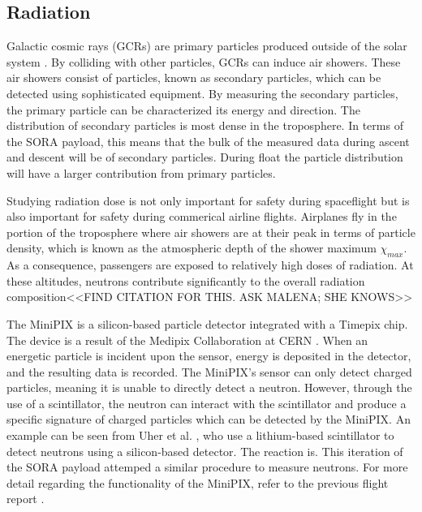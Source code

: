 \subsection{Radiation}
\label{sec: Radiation Background}

Galactic cosmic rays (GCRs) are primary particles produced outside of the solar system \cite{GCRs}.
By colliding with other particles, GCRs can induce air showers. 
These air showers consist of particles, known as secondary particles, which can be detected using sophisticated equipment.
By measuring the secondary particles, the primary particle can be characterized its energy and direction. 
The distribution of secondary particles \cite{Frank} is most dense in the troposphere. 
In terms of the SORA payload, this means that the bulk of the measured data during ascent and descent will 
be of secondary particles. During float the particle distribution will have a larger contribution from primary particles.

Studying radiation dose is not only important for safety during spaceflight but is also important for safety during commerical airline flights.
Airplanes fly in the portion of the troposphere where air showers are at their peak in terms of particle density, which is known as the atmospheric depth of the shower maximum $\chi _{max}$. As a consequence, passengers are exposed to relatively high doses of radiation.
At these altitudes, neutrons contribute significantly to the overall radiation composition<<FIND CITATION FOR THIS. ASK MALENA; SHE KNOWS>>

The MiniPIX \cite{silicon_sensor} is a silicon-based particle detector integrated with a Timepix \cite{timepix} chip. The device is a result of the Medipix Collaboration at CERN \cite{medipix}. 
When an energetic particle is incident upon the sensor, energy is deposited in the detector, and the resulting data is recorded.
The MiniPIX's sensor can only detect charged particles, meaning it is unable to directly detect a neutron. However, through the use of a scintillator, the neutron can interact with the scintillator and produce a specific signature of charged particles which can be detected by the MiniPIX.
An example can be seen from Uher et al. \cite{Uher}, who use a lithium-based scintillator to detect neutrons using a silicon-based detector. The reaction is.
This iteration of the SORA payload attemped a similar procedure to measure neutrons. 
For more detail regarding the functionality of the MiniPIX, refer to the previous flight report \cite{SORA}.
